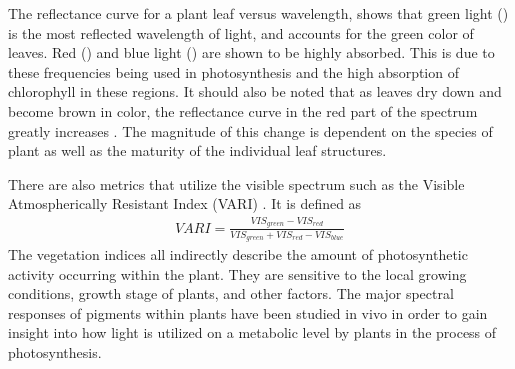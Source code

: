 The reflectance curve for a plant leaf versus wavelength, shows that green light () is the most reflected wavelength of light, and accounts for the green color of leaves. Red () and blue light () are shown to be highly absorbed.  This is due to these frequencies being used in photosynthesis and the high absorption of chlorophyll in these regions.
It should also be noted that as leaves dry down and become brown in color, the reflectance curve in the red part of the spectrum greatly increases \cite{photonvegetation}.  The magnitude of this change is dependent on the species of plant as well as the maturity of the individual leaf structures.

There are also metrics that utilize the visible spectrum such as the Visible Atmospherically Resistant Index (VARI) \cite{harris}.  It is defined as
%
\begin{align}
    VARI = \frac{VIS_{green} - VIS_{red}}{VIS_{green} + VIS_{red}-VIS_{blue}}
\end{align}
%
The vegetation indices all indirectly describe the amount of photosynthetic activity occurring within the plant.  They are sensitive to the local growing conditions, growth stage of plants, and other factors. The major spectral responses of pigments within plants have been studied in vivo in order to gain insight into how light is utilized on a metabolic level by plants in the process of photosynthesis.
